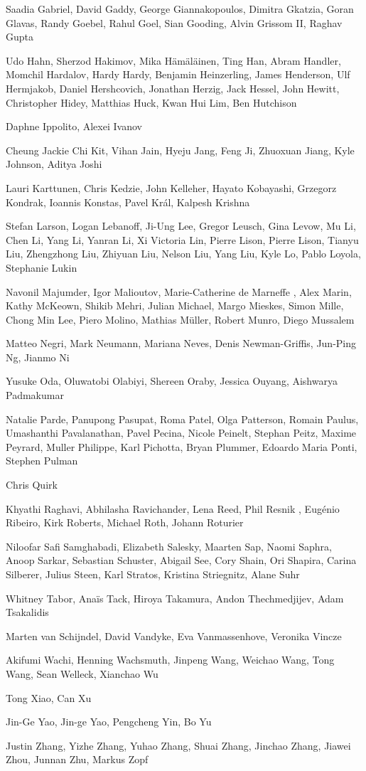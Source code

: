 \documentclass[11pt]{article}
\begin{document}
\begin{description}[itemsep=4mm, style=nextline]
Saadia Gabriel, 
David Gaddy, 
George Giannakopoulos, 
Dimitra Gkatzia, 
Goran Glavas, 
Randy Goebel, 
Rahul Goel, 
Sian Gooding, 
Alvin Grissom II, 
Raghav Gupta

Udo Hahn, 
Sherzod Hakimov, 
Mika Hämäläinen, 
Ting Han, 
Abram Handler, 
Momchil Hardalov, 
Hardy Hardy, 
Benjamin Heinzerling, 
James Henderson, 
Ulf Hermjakob, 
Daniel Hershcovich, 
Jonathan Herzig, 
Jack Hessel, 
John Hewitt, 
Christopher  Hidey, 
Matthias Huck, 
Kwan Hui Lim, 
Ben Hutchison

Daphne Ippolito, 
Alexei Ivanov

Cheung Jackie Chi Kit, 
Vihan Jain, 
Hyeju Jang, 
Feng Ji, 
Zhuoxuan Jiang, 
Kyle  Johnson, 
Aditya Joshi

Lauri Karttunen, 
Chris Kedzie, 
John Kelleher, 
Hayato Kobayashi, 
Grzegorz Kondrak, 
Ioannis Konstas, 
Pavel Král, 
Kalpesh Krishna

Stefan Larson, 
Logan Lebanoff, 
Ji-Ung Lee, 
Gregor Leusch, 
Gina Levow, 
Mu Li, 
Chen Li, 
Yang Li, 
Yanran Li, 
Xi Victoria  Lin, 
Pierre  Lison, 
Pierre Lison, 
Tianyu Liu, 
Zhengzhong Liu, 
Zhiyuan Liu, 
Nelson Liu, 
Yang Liu, 
Kyle Lo, 
Pablo Loyola, 
Stephanie Lukin

Navonil Majumder, 
Igor Malioutov, 
Marie-Catherine de Marneffe , 
Alex Marin, 
Kathy McKeown, 
Shikib Mehri, 
Julian Michael, 
Margo Mieskes, 
Simon Mille, 
Chong Min Lee, 
Piero Molino, 
Mathias Müller, 
Robert Munro, 
Diego Mussalem

Matteo Negri, 
Mark Neumann, 
Mariana Neves, 
Denis Newman-Griffis, 
Jun-Ping Ng, 
Jianmo  Ni

Yusuke Oda, 
Oluwatobi Olabiyi, 
Shereen Oraby, 
Jessica Ouyang, 
Aishwarya  Padmakumar

Natalie Parde, 
Panupong Pasupat, 
Roma Patel, 
Olga Patterson, 
Romain Paulus, 
Umashanthi Pavalanathan, 
Pavel Pecina, 
Nicole Peinelt, 
Stephan Peitz, 
Maxime Peyrard, 
Muller Philippe, 
Karl Pichotta, 
Bryan Plummer, 
Edoardo Maria Ponti, 
Stephen Pulman

Chris Quirk

Khyathi Raghavi, 
Abhilasha Ravichander, 
Lena Reed, 
Phil Resnik , 
Eugénio Ribeiro, 
Kirk Roberts, 
Michael Roth, 
Johann Roturier

Niloofar Safi Samghabadi, 
Elizabeth Salesky, 
Maarten Sap, 
Naomi Saphra, 
Anoop Sarkar, 
Sebastian Schuster, 
Abigail See, 
Cory Shain, 
Ori Shapira, 
Carina Silberer, 
Julius Steen, 
Karl Stratos, 
Kristina Striegnitz, 
Alane Suhr

Whitney Tabor, 
Anaïs Tack, 
Hiroya Takamura, 
Andon Thechmedjijev, 
Adam Tsakalidis

Marten van Schijndel, 
David Vandyke, 
Eva Vanmassenhove, 
Veronika Vincze

Akifumi Wachi, 
Henning  Wachsmuth, 
Jinpeng Wang, 
Weichao Wang, 
Tong Wang, 
Sean Welleck, 
Xianchao Wu

Tong Xiao, 
Can Xu

Jin-Ge Yao, 
Jin-ge Yao, 
Pengcheng Yin, 
Bo Yu

Justin Zhang, 
Yizhe Zhang, 
Yuhao Zhang, 
Shuai Zhang, 
Jinchao Zhang, 
Jiawei Zhou, 
Junnan Zhu, 
Markus Zopf
\end{description}
\end{document}
